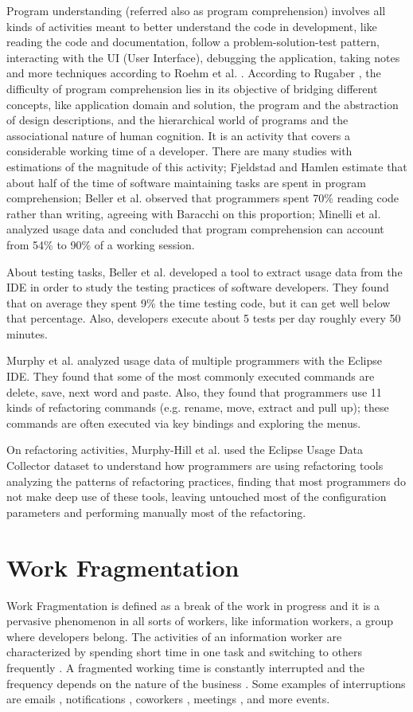 Program understanding (referred also as program comprehension) involves all kinds of activities meant to better understand the code in development, like reading the code and documentation, follow a problem-solution-test pattern, interacting with the UI (User Interface), debugging the application, taking notes and more techniques according to Roehm et al. \cite{RTK12}. According to Rugaber \cite{R95}, the difficulty of program comprehension lies in its objective of bridging different concepts, like application domain and solution, the program and the abstraction of design descriptions, and the hierarchical world of programs and the associational nature of human cognition. It is an activity that covers a considerable working time of a developer. There are many studies with estimations of the magnitude of this activity; Fjeldstad and Hamlen \cite{FH83} estimate that about half of the time of software maintaining tasks are spent in program comprehension; Beller et al. \cite{BGZ15} observed that programmers spent 70\% reading code rather than writing, agreeing with Baracchi \cite{B14} on this proportion; Minelli et al. \cite{MMLK14} analyzed usage data and concluded that program comprehension can account from 54\% to 90\% of a working session.

About testing tasks, Beller et al. \cite{BGZ15} developed a tool to extract usage data from the IDE in order to study the testing practices of software developers. They found that on average they spent 9\% the time testing code, but it can get well below that percentage. Also, developers execute about 5 tests per day roughly every 50 minutes.

Murphy et al. \cite{MKF06} analyzed usage data of multiple programmers with the Eclipse IDE. They found that some of the most commonly executed commands are delete, save, next word and paste. Also, they found that programmers use 11 kinds of refactoring commands (e.g. rename, move, extract and pull up); these commands are often executed via key bindings and exploring the menus.

On refactoring activities, Murphy-Hill et al. \cite{MPB12} used the Eclipse Usage Data Collector dataset to understand how programmers are using refactoring tools analyzing the patterns of refactoring practices, finding that most programmers do not make deep use of these tools, leaving untouched most of the configuration parameters and performing manually most of the refactoring.

\section{Work Fragmentation}
Work Fragmentation is defined as a break of the work in progress and it is a pervasive phenomenon in all sorts of workers, like information workers, a group where developers belong. The activities of an information worker are characterized by spending short time in one task and switching to others frequently \cite{MGH05}. A fragmented working time is constantly interrupted and the frequency depends on the nature of the business \cite{T99}. Some examples of interruptions are emails \cite{BJE05}, notifications \cite{CCH01}, coworkers \cite{LVD06}, meetings \cite{LR05}, and more events.

